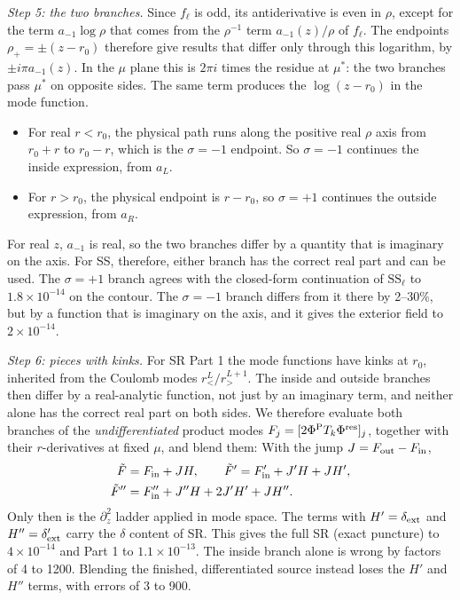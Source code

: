 \documentclass[aps,prl,twocolumn,superscriptaddress,nofootinbib,floatfix]{revtex4-2}
\newcommand{\dext}{\delta_{\rm ext}}
\newcommand{\PhiP}{\Phi^{\rm P}}
\newcommand{\Pres}{\Phi^{\rm res}}
\begin{document}
\emph{Step 5: the two branches.}
Since $f_\ell$ is odd, its antiderivative is even in $\rho$, except for the term $a_{-1}\log\rho$ that comes from the $\rho^{-1}$ term $a_{-1}(z)/\rho$ of $f_\ell$.
The endpoints $\rho_+=\pm(z-r_0)$ therefore give results that differ only through this logarithm, by $\pm i\pi a_{-1}(z)$.
In the $\mu$ plane this is $2\pi i$ times the residue at $\mu^*$: the two branches pass $\mu^*$ on opposite sides.
The same term produces the $\log(z-r_0)$ in the mode function.
\begin{itemize}
\item For real $r<r_0$, the physical path runs along the positive real $\rho$ axis from $r_0+r$ to $r_0-r$, which is the $\sigma=-1$ endpoint. So $\sigma=-1$ continues the inside expression, from $a_L$.
\item For $r>r_0$, the physical endpoint is $r-r_0$, so $\sigma=+1$ continues the outside expression, from $a_R$.
\end{itemize}
For real $z$, $a_{-1}$ is real, so the two branches differ by a quantity that is imaginary on the axis.
For SS, therefore, either branch has the correct real part and can be used.
The $\sigma=+1$ branch agrees with the closed-form continuation of $\mathrm{SS}_\ell$ to $1.8\times10^{-14}$ on the contour.
The $\sigma=-1$ branch differs from it there by 2--30\%, but by a function that is imaginary on the axis, and it gives the exterior field to $2\times10^{-14}$.

\emph{Step 6: pieces with kinks.}
For SR Part 1 the mode functions have kinks at $r_0$, inherited from the Coulomb modes $r_<^L/r_>^{L+1}$.
The inside and outside branches then differ by a real-analytic function, not just by an imaginary term, and neither alone has the correct real part on both sides.
We therefore evaluate both branches of the \emph{undifferentiated} product modes $F_j=[2\PhiP T_k\Pres]_j$, together with their $r$-derivatives at fixed $\mu$, and blend them:
With the jump $J=F_{\rm out}-F_{\rm in}$,
\begin{align}
\tilde F&=F_{\rm in}+JH,\qquad
\tilde F'=F'_{\rm in}+J'H+JH',\nonumber\\
\tilde F''&=F''_{\rm in}+J''H+2J'H'+JH''.
\end{align}
Only then is the $\partial_z^2$ ladder applied in mode space.
The terms with $H'=\dext$ and $H''=\dext'$ carry the $\delta$ content of SR.
This gives the full SR (exact puncture) to $4\times10^{-14}$ and Part 1 to $1.1\times10^{-13}$.
The inside branch alone is wrong by factors of 4 to 1200.
Blending the finished, differentiated source instead loses the $H'$ and $H''$ terms, with errors of 3 to 900.
\end{document}
